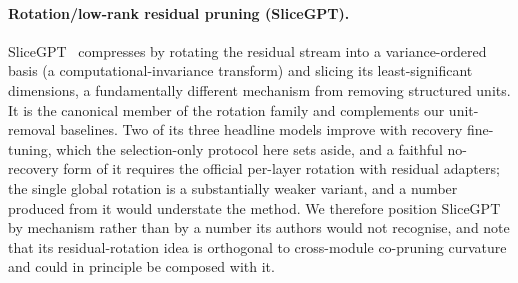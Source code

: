 \paragraph{Rotation/low-rank residual pruning (SliceGPT).} SliceGPT~\citep{ashkboos2024slicegpt}
compresses by rotating the residual stream into a variance-ordered basis (a computational-invariance
transform) and slicing its least-significant dimensions, a fundamentally different mechanism from
removing structured units. It is the canonical member of the rotation family and complements our
unit-removal baselines. Two of its three headline models improve with recovery fine-tuning, which the selection-only protocol
here sets aside, and a faithful no-recovery form of it requires the official per-layer rotation with residual
adapters; the single global rotation is a substantially weaker variant, and a number produced from
it would understate the method. We therefore position SliceGPT by mechanism rather than by a number
its authors would not recognise, and
note that its residual-rotation idea is orthogonal to cross-module co-pruning curvature and
could in principle be composed with it.

